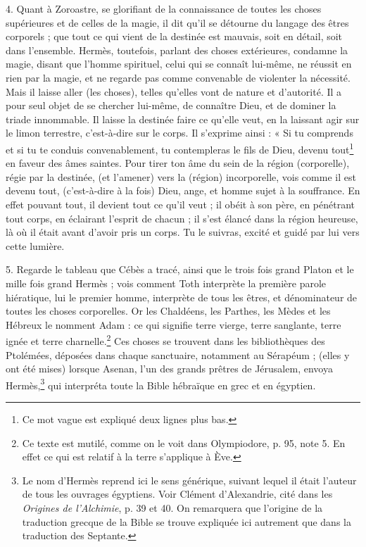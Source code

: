 \documentclass[landscape, a4paper, 11pt, oneside, polutonikogreek, french]{article}
\begin{document}
4. Quant à Zoroastre, se glorifiant de la connaissance de toutes les choses supérieures et de celles de la magie, il dit qu'il se détourne du langage des êtres corporels ; que tout ce qui vient de la destinée est mauvais, soit en détail, soit dans l'ensemble. Hermès, toutefois, parlant des choses extérieures, condamne la magie, disant que l'homme spirituel, celui qui se connaît lui-même, ne réussit en rien par la magie, et ne regarde pas comme convenable de violenter la nécessité. Mais il laisse aller (les choses), telles qu'elles vont de nature et d'autorité. Il a pour seul objet de se chercher lui-même, de connaître Dieu, et de dominer la triade innommable. Il laisse la destinée faire ce qu'elle veut, en la laissant agir sur le limon terrestre, c'est-à-dire sur le corps. Il s'exprime ainsi : « Si tu comprends et si tu te conduis convenablement, tu contempleras le fils de Dieu, devenu tout\footnote{Ce mot vague est expliqué deux lignes plus bas.} en faveur des âmes saintes. Pour tirer ton âme du sein de la région (corporelle), régie par la destinée, (et l'amener) vers la (région) incorporelle, vois comme il est devenu tout, (c'est-à-dire à la fois) Dieu, ange, et homme sujet à la souffrance. En effet pouvant tout, il devient tout ce qu'il veut ; il obéit à son père, en pénétrant tout corps, en éclairant l'esprit de chacun ; il s'est élancé dans la région heureuse, là où il était avant d'avoir pris un corps. Tu le suivras, excité et guidé par lui vers cette lumière.

5. Regarde le tableau que Cébès a tracé, ainsi que le trois fois grand Platon et le mille fois grand Hermès ; vois comment Toth interprète la première parole hiératique, lui le premier homme, interprète de tous les êtres, et dénominateur de toutes les choses corporelles. Or les Chaldéens, les Parthes, les Mèdes et les Hébreux le nomment Adam : ce qui signifie terre vierge, terre sanglante, terre ignée et terre charnelle.\footnote{Ce texte est mutilé, comme on le voit dans Olympiodore, p. 95, note 5. En effet ce qui est relatif à la terre s'applique à Ève.} Ces choses se trouvent dans les bibliothèques des Ptolémées, déposées dans chaque sanctuaire, notamment au Sérapéum ; (elles y ont été mises) lorsque Asenan, l'un des grands prêtres de Jérusalem, envoya Hermès,\footnote{Le nom d'Hermès reprend ici le sens générique, suivant lequel il était l'auteur de tous les ouvrages égyptiens. Voir Clément d'Alexandrie, cité dans les \emph{Origines de l'Alchimie}, p. 39 et 40. On remarquera que l'origine de la traduction grecque de la Bible se trouve expliquée ici autrement que dans la traduction des Septante.} qui interpréta toute la Bible hébraïque en grec et en égyptien.
\end{document}
